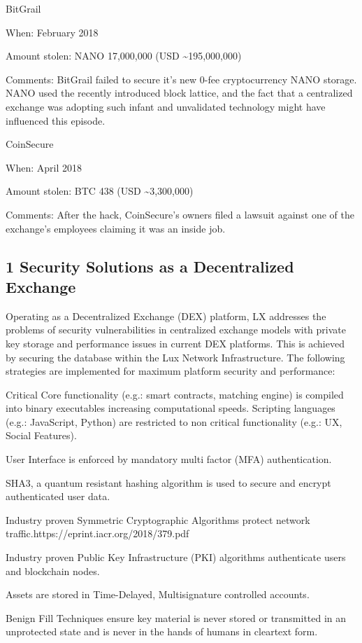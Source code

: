\documentclass[11pt]{article}
\begin{document}
BitGrail


When: February 2018


Amount stolen: NANO 17,000,000 (USD \textasciitilde{}195,000,000)


Comments: BitGrail failed to secure it's new 0-fee cryptocurrency NANO storage. NANO used the recently introduced block lattice, and the fact that a centralized exchange was adopting such infant and unvalidated technology might have influenced this episode.


CoinSecure


When: April 2018


Amount stolen: BTC 438 (USD \textasciitilde{}3,300,000)


Comments: After the hack, CoinSecure's owners filed a lawsuit against one of the exchange's employees claiming it was an inside job.


\subsection{1 Security Solutions as a Decentralized Exchange}

Operating as a Decentralized Exchange (DEX) platform, LX addresses the problems of security vulnerabilities in centralized exchange models with private key storage and performance issues in current DEX platforms. This is achieved by securing the database within the Lux Network Infrastructure. The following strategies are implemented for maximum platform security and performance:


Critical Core functionality (e.g.: smart contracts, matching engine) is compiled into binary executables increasing computational speeds. Scripting languages (e.g.: JavaScript, Python) are restricted to non critical functionality (e.g.: UX, Social Features).


User Interface is enforced by mandatory multi factor (MFA) authentication.


SHA3, a quantum resistant hashing algorithm is used to secure and encrypt authenticated user data.


Industry proven Symmetric Cryptographic Algorithms protect network traffic.https://eprint.iacr.org/2018/379.pdf


Industry proven Public Key Infrastructure (PKI) algorithms authenticate users and blockchain nodes.


Assets are stored in Time-Delayed, Multisignature controlled accounts.


Benign Fill Techniques ensure key material is never stored or transmitted in an unprotected state and is never in the hands of humans in cleartext form.
\end{document}
